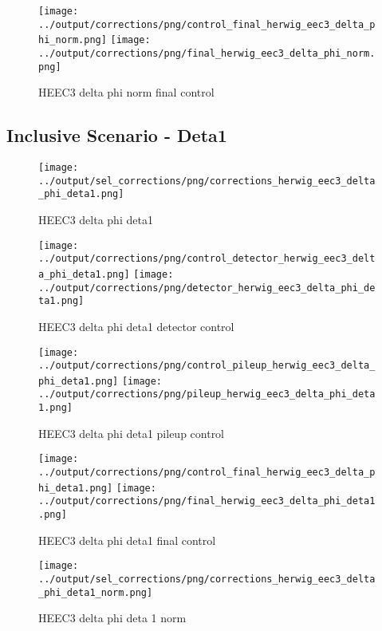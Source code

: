 \documentclass[11pt]{book}
\begin{document}
\begin{figure}[ht]
\centering
\texttt{[image: ../output/corrections/png/control\_final\_herwig\_eec3\_delta\_phi\_norm.png]}
\texttt{[image: ../output/corrections/png/final\_herwig\_eec3\_delta\_phi\_norm.png]}
\caption{HEEC3 delta phi norm final control}
\label{fig:HEEC3_delta_phi_norm_final_control}
\end{figure}

\clearpage
\subsection{Inclusive Scenario - Deta1}
\begin{figure}[ht]
\centering
\texttt{[image: ../output/sel\_corrections/png/corrections\_herwig\_eec3\_delta\_phi\_deta1.png]}
\caption{HEEC3 delta phi deta1}
\label{fig:HEEC3_delta_phi_deta1}
\end{figure}

\begin{figure}[ht]
\centering
\texttt{[image: ../output/corrections/png/control\_detector\_herwig\_eec3\_delta\_phi\_deta1.png]}
\texttt{[image: ../output/corrections/png/detector\_herwig\_eec3\_delta\_phi\_deta1.png]}
\caption{HEEC3 delta phi deta1 detector control}
\label{fig:HEEC3_delta_phi_deta1_detector_control}
\end{figure}

\begin{figure}[ht]
\centering
\texttt{[image: ../output/corrections/png/control\_pileup\_herwig\_eec3\_delta\_phi\_deta1.png]}
\texttt{[image: ../output/corrections/png/pileup\_herwig\_eec3\_delta\_phi\_deta1.png]}
\caption{HEEC3 delta phi deta1 pileup control}
\label{fig:HEEC3_delta_phi_deta1_pileup_control}
\end{figure}


\begin{figure}[ht]
\centering
\texttt{[image: ../output/corrections/png/control\_final\_herwig\_eec3\_delta\_phi\_deta1.png]}
\texttt{[image: ../output/corrections/png/final\_herwig\_eec3\_delta\_phi\_deta1.png]}
\caption{HEEC3 delta phi deta1 final control}
\label{fig:HEEC3_delta_phi_deta1_final_control}
\end{figure}

\begin{figure}[ht]
\centering
\texttt{[image: ../output/sel\_corrections/png/corrections\_herwig\_eec3\_delta\_phi\_deta1\_norm.png]}
\caption{HEEC3 delta phi deta 1 norm}
\label{fig:HEEC3_delta_phi_deta1_norm}
\end{figure}
\end{document}
